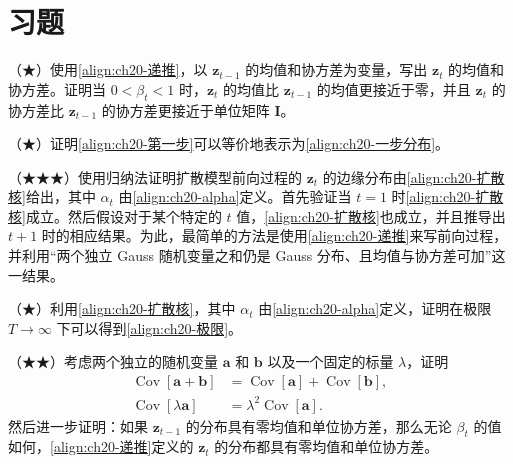 \documentclass[../../main.tex]{subfiles}
\begin{document}
\section{习题}\label{section:ch20-习题}

\begin{exercise}\label{exercise:ch20-01}
（★）使用\eqref{align:ch20-递推}，以 $\bm{z}_{t-1}$ 的均值和协方差为变量，写出 $\bm{z}_t$ 的均值和协方差。证明当 $0<\beta_t<1$ 时，$\bm{z}_t$ 的均值比 $\bm{z}_{t-1}$ 的均值更接近于零，并且 $\bm{z}_t$ 的协方差比 $\bm{z}_{t-1}$ 的协方差更接近于单位矩阵 $\bm{I}$。
\end{exercise}

\begin{exercise}\label{exercise:ch20-02}
（★）证明\eqref{align:ch20-第一步}可以等价地表示为\eqref{align:ch20-一步分布}。
\end{exercise}

\begin{exercise}\label{exercise:ch20-03}
（★★★）使用归纳法证明扩散模型前向过程的 $\bm{z}_t$ 的边缘分布由\eqref{align:ch20-扩散核}给出，其中 $\alpha_t$ 由\eqref{align:ch20-alpha}定义。首先验证当 $t=1$ 时\eqref{align:ch20-扩散核}成立。然后假设对于某个特定的 $t$ 值，\eqref{align:ch20-扩散核}也成立，并且推导出 $t+1$ 时的相应结果。为此，最简单的方法是使用\eqref{align:ch20-递推}来写前向过程，并利用“两个独立 Gauss 随机变量之和仍是 Gauss 分布、且均值与协方差可加”这一结果。
\end{exercise}

\begin{exercise}\label{exercise:ch20-04}
（★）利用\eqref{align:ch20-扩散核}，其中 $\alpha_t$ 由\eqref{align:ch20-alpha}定义，证明在极限 $T\to\infty$ 下可以得到\eqref{align:ch20-极限}。
\end{exercise}

\begin{exercise}\label{exercise:ch20-05}
（★★）考虑两个独立的随机变量 $\bm{a}$ 和 $\bm{b}$ 以及一个固定的标量 $\lambda$，证明
\begin{align}
\operatorname{Cov}[\bm{a}+\bm{b}]&=\operatorname{Cov}[\bm{a}]+\operatorname{Cov}[\bm{b}],
\label{align:ch20-协方差可加}\\
\operatorname{Cov}[\lambda\bm{a}]&=\lambda^2\operatorname{Cov}[\bm{a}].
\label{align:ch20-协方差缩放}
\end{align}
然后进一步证明：如果 $\bm{z}_{t-1}$ 的分布具有零均值和单位协方差，那么无论 $\beta_t$ 的值如何，\eqref{align:ch20-递推}定义的 $\bm{z}_t$ 的分布都具有零均值和单位协方差。
\end{exercise}
\end{document}
